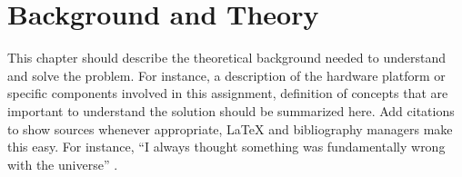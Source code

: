 \chapter{Background and Theory}
This chapter should describe the theoretical background needed to understand and solve the problem. 
For instance, a description of the hardware platform or specific components involved in this assignment, definition of concepts that are important to understand the solution should be summarized here.
Add citations to show sources whenever appropriate, LaTeX and bibliography managers make this easy. For instance, ``I always thought something was fundamentally wrong with the universe'' \cite{adams1995hitchhiker}.